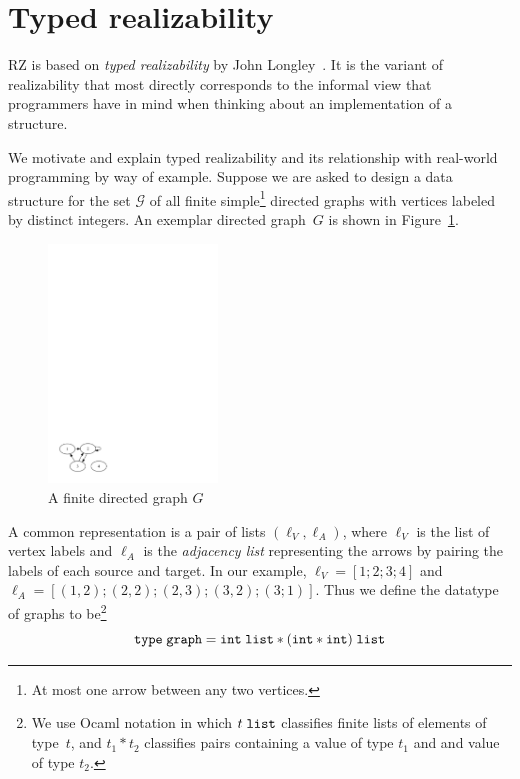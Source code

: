 \section{Typed realizability}
\label{sec:typed-realizability}

RZ is based on \emph{typed realizability} by John
Longley~\cite{Longley99}. It is the variant of realizability that most
directly corresponds to the informal view that programmers have in
mind when thinking about an implementation of a structure.

We motivate and explain typed realizability and its relationship with
real-world programming by way of example. Suppose we are asked to
design a data structure for the set $\mathcal{G}$ of all finite
simple\footnote{At most one arrow between any two vertices.}
directed graphs with vertices labeled by distinct integers. An exemplar
directed graph~$G$ is shown in Figure~\ref{fig:digraph}.
%
\begin{figure}
  \centering
  \includegraphics[width=0.4\textwidth]{digraph}
  \caption{A finite directed graph $G$}
  \label{fig:digraph}
\end{figure}
%
A common representation is a pair of lists $(\ell_V, \ell_A)$, where
$\ell_V$ is the list of vertex labels and $\ell_A$ is the \emph{adjacency list} 
representing the arrows by pairing the labels of each source and target.
In our example, $\ell_V = [1; 2;
3; 4]$ and $\ell_A = [(1,2); (2,2); (2,3); (3,2); (3;1)]$. Thus we
define the datatype of graphs to be\footnote{We use Ocaml notation in
  which $t\;\mathtt{list}$ classifies finite lists of elements of type~$t$, and
  $t_1 * t_2$ classifies pairs containing a value of type $t_1$ and and 
  value of type $t_2$.}
%
\begin{equation*}
  \mathtt{type}\; \mathtt{graph} = \mathtt{int}\;\mathtt{list} * (\mathtt{int} * \mathtt{int})\;\mathtt{list}
\end{equation*}
